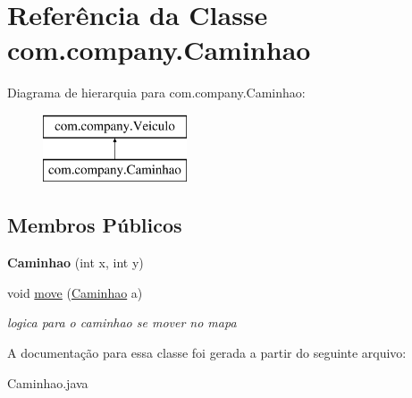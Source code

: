 \hypertarget{classcom_1_1company_1_1_caminhao}{}\section{Referência da Classe com.\+company.\+Caminhao}
\label{classcom_1_1company_1_1_caminhao}
Diagrama de hierarquia para com.\+company.\+Caminhao\+:\begin{figure}[H]
\begin{center}
\leavevmode
\includegraphics[height=2.000000cm]{classcom_1_1company_1_1_caminhao}
\end{center}
\end{figure}
\subsection*{Membros Públicos}
\begin{DoxyCompactItemize}
\item 
\mbox{\label{classcom_1_1company_1_1_caminhao_ae170d22b1de70887d19e62b1c5bf9c13}} 
{\bfseries Caminhao} (int x, int y)
\item 
\mbox{\label{classcom_1_1company_1_1_caminhao_acee8e3ca4f4c8659fdfc8bfb527a3273}} 
void \mbox{\hyperlink{classcom_1_1company_1_1_caminhao_acee8e3ca4f4c8659fdfc8bfb527a3273}{move}} (\mbox{\hyperlink{classcom_1_1company_1_1_caminhao}{Caminhao}} a)
\begin{DoxyCompactList}\small\item\em logica para o caminhao se mover no mapa \end{DoxyCompactList}\end{DoxyCompactItemize}


A documentação para essa classe foi gerada a partir do seguinte arquivo\+:\begin{DoxyCompactItemize}
\item 
Caminhao.\+java\end{DoxyCompactItemize}
